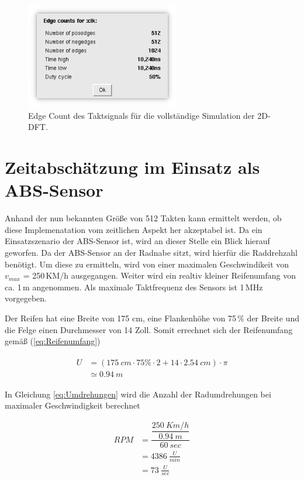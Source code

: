  \begin{figure}[htbp]
  \centering
  \includegraphics[width=0.6\textwidth]{img/Simulation_edge_count_clk.png}
  \caption{Edge Count des Taktsignals für die vollständige Simulation der 2D-DFT.}
 \end{figure}

 \section{Zeitabschätzung im Einsatz als ABS-Sensor}
 Anhand der nun bekannten Größe von 512 Takten kann ermittelt werden, ob diese Implemenatation vom zeitlichen Aspekt her akzeptabel ist.
 Da ein Einsatzszenario der ABS-Sensor ist, wird an dieser Stelle ein Blick hierauf geworfen. Da der ABS-Sensor an der Radnabe sitzt, wird 
 hierfür die Raddrehzahl benötigt. Um diese zu ermitteln, wird von einer maximalen Geschwindikeit von $v_{max}$ = 250\,KM/h ausgegangen. 
 Weiter wird ein realtiv kleiner Reifenumfang von ca. 1\,m angenommen. Als maximale Taktfrequenz des Sensors ist 1\,MHz vorgegeben.
 
 Der Reifen hat eine Breite von 175 cm, eine Flankenhöhe von 75\,$\%$ der Breite und die Felge einen Durchmesser von 14 Zoll. Somit errechnet sich der Reifenumfang
 gemäß (\ref{eq:Reifenumfang})
 
 \begin{align}\label{eq:Reifenumfang}
 \begin{split}
  U &= (\SI{175}{cm} \cdot 75\% \cdot 2 + 14 \cdot \SI{2.54}{cm})\cdot \pi\\
    &\simeq \SI{0,94}{m}
 \end{split}
 \end{align}

 In Gleichung \ref{eq:Umdrehungen} wird die Anzahl der Radumdrehungen bei maximaler Geschwindigkeit berechnet
 
 \begin{equation}\label{eq:Umdrehungen}
  \begin{split}
   RPM &= \dfrac{\dfrac{\SI{250}{Km/h}}{\SI{0,94}{m}}}{\SI{60}{sec}}\\
       &= \SI{4386}{\frac{U}{min}}\\
       &= \SI{73}{\frac{U}{sec}}
  \end{split}
 \end{equation}

